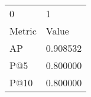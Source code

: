 \begin{tabular}{ll}
0 & 1 \\
Metric & Value \\
AP & 0.908532 \\
P@5 & 0.800000 \\
P@10 & 0.800000 \\
\end{tabular}
